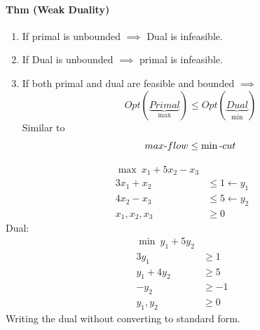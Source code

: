 \documentclass[12 pt]{article}
\begin{document}
          \paragraph{Thm (Weak Duality)}
          \begin{enumerate}
          \item If primal is unbounded $\implies$ Dual is infeasible.
          \item If Dual is unbounded $\implies$ primal is infeasible.
          \item If both primal and dual are feasible and bounded
            $\implies$
            $$Opt(\underbrace{Primal}_{\max}) \leq
            Opt(\underbrace{Dual}_{\min})$$
            Similar to $$max\hbox{-}flow \leq \min\hbox{-}cut$$
          \end{enumerate}
          \begin{align*}
            \max \ x_1 + 5x_2 - x_3 &
            \\ 3x_1 + x_2 & \leq 1 \gets y_1
            \\ 4x_2 - x_3 & \leq 5 \gets y_2
            \\ x_1, x_2, x_3 & \geq 0
          \end{align*}
          Dual:
          \begin{align*}
            \min \ y_1 + 5y_2 &
            \\ 3y_1 & \geq 1
            \\ y_1 + 4y_2 & \geq 5
            \\ -y_2 & \geq -1
            \\ y_1, y_2 & \geq 0
          \end{align*}
          Writing the dual without converting to standard form.
\end{document}

